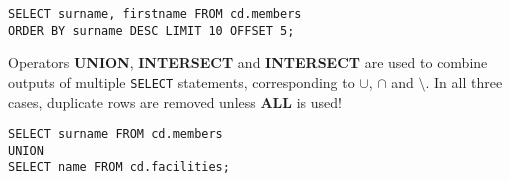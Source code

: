 \begin{verbatim}
SELECT surname, firstname FROM cd.members
ORDER BY surname DESC LIMIT 10 OFFSET 5;
\end{verbatim}

Operators \textbf{UNION}, \textbf{INTERSECT} and \textbf{INTERSECT} are used to combine outputs of multiple \texttt{SELECT} statements, corresponding to $\cup$, $\cap$ and $\setminus$.
In all three cases, duplicate rows are removed unless \textbf{ALL} is used!
\begin{verbatim}
SELECT surname FROM cd.members
UNION
SELECT name FROM cd.facilities;
\end{verbatim}

%